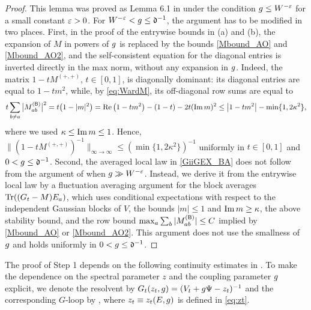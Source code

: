\begin{proof}
This lemma was proved as Lemma 6.1 in \cite{RBSO1D} under the condition $g\le W^{-{\varepsilon}}$ for a small constant ${\varepsilon}>0$. For $W^{-{\varepsilon}}<g\le{\mathfrak d}^{-1}$, the argument has to be modified in two places.
First, in the proof of the entrywise bounds in (a) and (b), the expansion of $M$ in powers of $g$ is replaced by the bounds \eqref{Mbound_AO} and \eqref{Mbound_AO2}, and the self-consistent equation for the diagonal entries is inverted directly in the max norm, without any expansion in $g$. Indeed, the matrix $1-tM^{(+,+)}$, $t\in[0,1]$, is diagonally dominant: its diagonal entries are equal to $1-tm^2$, while, by \eqref{eq:WardM}, its off-diagonal row sums are equal to
\[ t\sum_{b\ne a}\big|M^{({\mathsf{B}})}_{ab}\big|^2=t\big(1-|m|^2\big)=\operatorname{{\mathrm{Re}}}\big(1-tm^2\big)-(1-t)-2t(\operatorname{{\mathrm{Im}}} m)^2\le \big|1-tm^2\big|-\min\{1,2\kappa^2\}, \]
where we used $\kappa\le\operatorname{{\mathrm{Im}}} m\le 1$. Hence, $\|(1-tM^{(+,+)})^{-1}\|_{\infty\to\infty}\le (\min\{1,2\kappa^2\})^{-1}$ uniformly in $t\in[0,1]$ and $0<g\le{\mathfrak d}^{-1}$.
Second, the averaged local law in \eqref{GiiGEX_BA} does not follow from the argument of \cite{RBSO1D} when $g\gg W^{-{\varepsilon}}$. Instead, we derive it from the entrywise local law by a fluctuation averaging argument for the block averages $\operatorname{Tr}((G_t-M)E_a)$, which uses conditional expectations with respect to the independent Gaussian blocks of $V$, the bounds $|m|\le1$ and $\operatorname{{\mathrm{Im}}} m\ge\kappa$, the above stability bound, and the row bound $\max_a\sum_b|M^{({\mathsf{B}})}_{ab}|\le C$ implied by \eqref{Mbound_AO} or \eqref{Mbound_AO2}. This argument does not use the smallness of $g$ and holds uniformly in $0<g\le{\mathfrak d}^{-1}$.
\end{proof}



The proof of Step 1 depends on the following continuity estimates in . To make the dependence on the spectral parameter $z$ and the coupling parameter $g$ explicit, we denote the resolvent by \(G_t(z_t, g)=(V_t+g\Psi-z_t)^{-1}\) and the corresponding $G$-loop by , where $z_t\equiv z_t(E,g)$ is defined in \eqref{eq:zt}. %

